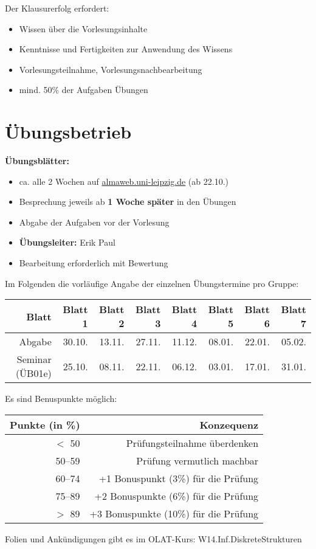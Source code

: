 \documentclass[diskretestrukturen.tex]{subfiles}
\begin{document}
  Der Klausurerfolg erfordert:
  \begin{itemize}
    \item Wissen \"uber die Vorlesungsinhalte
    \item Kenntnisse und Fertigkeiten zur Anwendung des Wissens
    \item Vorlesungsteilnahme, Vorlesungsnachbearbeitung
    \item mind. 50\% der Aufgaben
    \"Ubungen
  \end{itemize}


  \section*{\"Ubungsbetrieb}
  \begin{description}
    \item \textbf{\"Ubungsbl\"atter:}
    \begin{itemize}
      \item ca. alle 2 Wochen auf \url{almaweb.uni-leipzig.de} (ab 22.10.)
      \item Besprechung jeweils ab \textbf{1 Woche sp\"ater} in den \"Ubungen
      \item Abgabe der Aufgaben vor der Vorlesung
      \item \textbf{\"Ubungsleiter:} Erik Paul
      \item Bearbeitung erforderlich mit Bewertung
    \end{itemize}
  \end{description}

  Im Folgenden die vorl\"aufige Angabe der einzelnen \"Ubungstermine pro Gruppe:

  \begin{tabular}{r|rrrrrrr}
    Blatt & Blatt 1 & Blatt 2 & Blatt 3 & Blatt 4 & Blatt 5 & Blatt 6 & Blatt 7  \\
    \hline
    Abgabe & 30.10. & 13.11. & 27.11. & 11.12. & 08.01. & 22.01. & 05.02.  \\
    Seminar (\"UB01e) & 25.10. & 08.11. & 22.11. & 06.12. & 03.01. & 17.01. & 31.01.  \\
  \end{tabular}

  Es sind Benuspunkte m\"oglich:

  \begin{tabular}{r|r}
    \hline
    Punkte (in \%) & Konzequenz  \\
    \hline
    $<$ 50 & Pr\"ufungsteilnahme \"uberdenken  \\
    50--59 & Pr\"ufung vermutlich machbar  \\
    60--74 & +1 Bonuspunkt (3\%) f\"ur die Pr\"ufung  \\
    75--89 & +2 Bonuspunkte (6\%) f\"ur die Pr\"ufung  \\
    $>$ 89 & +3 Bonuspunkte (10\%) f\"ur die Pr\"ufung  \\
    \hline
  \end{tabular}

  Folien und Ank\"undigungen gibt es im OLAT-Kurs: W14.Inf.DiskreteStrukturen
\end{document}
